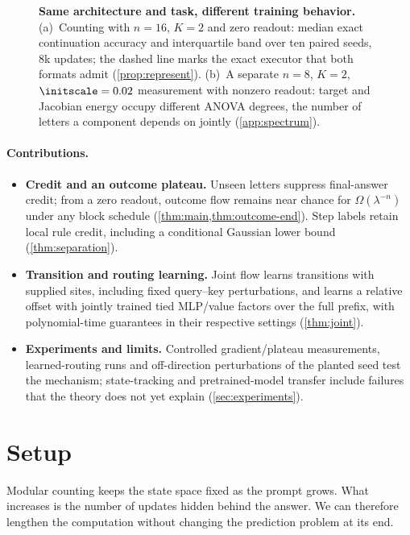\begin{figure}[t]
\centering

\caption{\textbf{Same architecture and task, different training behavior.}
(a)~Counting with $n=16$, $K=2$ and zero readout: median exact continuation accuracy and interquartile band over ten paired seeds, $8$k
updates; the dashed line marks the exact executor that both formats admit (\cref{prop:represent}).
(b)~A separate $n=8$, $K=2$, $\initscale=0.02$ measurement with nonzero readout: target and Jacobian energy occupy different ANOVA degrees, the number of letters a component depends on jointly (\cref{app:spectrum}).}
\label{fig:overview}
\end{figure}

\paragraph{Contributions.}
\begin{itemize}[leftmargin=*,itemsep=2pt,topsep=2pt]
\item \textbf{Credit and an outcome plateau.} Unseen letters suppress final-answer credit;
from a zero readout, outcome flow remains near chance for $\Omega(\lambda^{-n})$
under any block schedule (\cref{thm:main,thm:outcome-end}). Step labels retain local rule
credit, including a conditional Gaussian lower bound (\cref{thm:separation}).
\item \textbf{Transition and routing learning.} Joint flow learns transitions with supplied
sites, including fixed query--key perturbations, and learns a relative offset with jointly trained tied MLP/value factors over the full prefix, with polynomial-time guarantees in their respective settings
(\cref{thm:joint}).
\item \textbf{Experiments and limits.} Controlled gradient/plateau measurements, learned-routing
runs and off-direction perturbations of the planted seed test the mechanism; state-tracking and pretrained-model transfer include failures
that the theory does not yet explain (\cref{sec:experiments}).
\end{itemize}

\section{Setup}
\label{sec:setup}
\label{sec:setting}

Modular counting keeps the state space fixed as the prompt grows. What increases is the number of updates hidden behind the
answer. We can therefore lengthen the computation without changing the prediction problem at its end.

